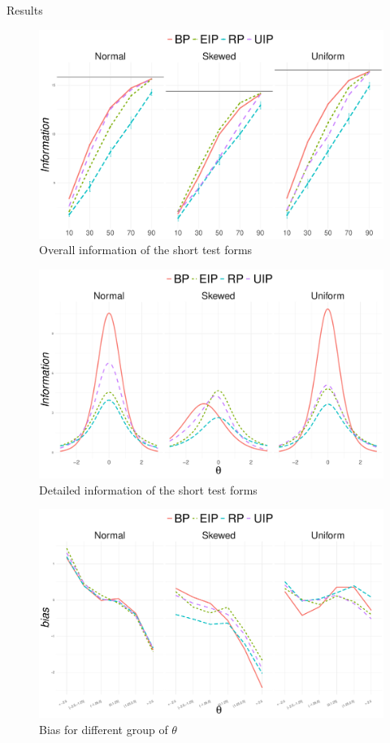 \documentclass[final,t]{beamer}
\begin{document}
\begin{frame}
\begin{columns}[t]
\begin{column}{.45\linewidth}
				\begin{block}{\centering Results}
					\begin{figure}
						\includegraphics[width=\linewidth]{img/info.pdf}
						\caption{Overall information of the short test forms}
					\end{figure}
				
				\begin{figure}
					\includegraphics[width=\linewidth]{img/infoDetails.pdf}
					\caption{Detailed information of the short test forms}
				\end{figure}
			
				\begin{figure}
				\includegraphics[width=\linewidth]{img/BIAS.pdf}
				\caption{Bias for different group of $\theta$}
			\end{figure}
				\end{block}
				

\end{column}
\end{columns}
\end{frame}
\end{document}
